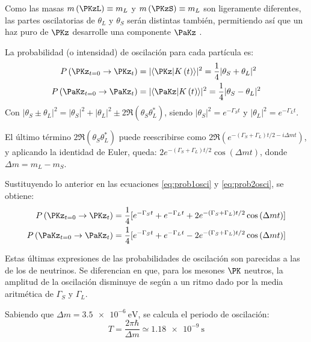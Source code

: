 Como las masas $m\left(\PKzL\right) \equiv m_{L}$ y $m\left(\PKzS\right) \equiv m_{L}$ son ligeramente diferentes, las partes oscilatorias de $\theta_{L}$ y $\theta_{S}$ serán distintas también, permitiendo así que un haz puro de $\PKz$ desarrolle una componente $\PaKz$ \cite{Thomson}.

La probabilidad (o intensidad) de oscilación para cada partícula es:
\begin{align}
P\left(\PKz_{t=0} \rightarrow \PKz_{t}\right)&= |\langle\PKz|K\left(t\right)\rangle|^2 =\dfrac{1}{4}|\theta_{S}+\theta_{L}|^2\label{eq:prob1osci}\\
P\left(\PaKz_{t=0} \rightarrow \PaKz_{t}\right)&= |\langle\PaKz|K\left(t\right)\rangle|^2 =\dfrac{1}{4}|\theta_{S}-\theta_{L}|^2\label{eq:prob2osci}
\end{align}
Con $|\theta_{S} \pm \theta_{L}|^2=|\theta_{S}|^2+|\theta_{L}|^2 \pm 2\Re\left(\theta_{S}\theta_{L}^{\ast}\right)$, siendo $|\theta_{S}|^2=e^{-\Gamma_{S} t}$ y $|\theta_{L}|^2=e^{-\Gamma_{L} t}$. 

El último término $2\Re\left(\theta_{S}\theta_{L}^{\ast}\right)$ puede reescribirse como $2\Re\left(e^{-\left(\Gamma_{S}+\Gamma_{L}\right)t/2-i\Delta mt}\right)$, y aplicando la identidad de Euler, queda: $2e^{-\left(\Gamma_{S}+\Gamma_{L}\right)t/2} \cos \left(\Delta mt\right)$, donde $\Delta m = m_{L}-m_{S}$.

Sustituyendo lo anterior en las ecuaciones \ref{eq:prob1osci} y \ref{eq:prob2osci}, se obtiene:
\begin{align}
P\left(\PKz_{t=0} \rightarrow \PKz_{t}\right) &= \dfrac{1}{4}[e^{-\Gamma_{S}t}+e^{-\Gamma_{L}t}+ 2e^{-\left(\Gamma_{S}+\Gamma_{L}\right)t/2} \cos \left(\Delta mt\right)]\label{eq:int1} \\
P\left(\PaKz_{t=0} \rightarrow \PaKz_{t}\right) &= \dfrac{1}{4}[e^{-\Gamma_{S}t}+e^{-\Gamma_{L}t}-2e^{-\left(\Gamma_{S}+\Gamma_{L}\right)t/2} \cos \left(\Delta mt\right)]\label{eq:int2}
\end{align}

Estas últimas expresiones de las probabilidades de oscilación son parecidas a las de los de neutrinos. Se diferencian en que, para los mesones $\PK$ neutros, la amplitud de la oscilación disminuye de según a un ritmo dado por la media aritmética de $\Gamma_{S}$ y $\Gamma_{L}$.

Sabiendo que $\Delta m = \SI{3,5e-6}{\eV}$, se calcula el periodo de oscilación:
\begin{equation}
T=\dfrac{2\pi\hbar}{\Delta m} \simeq \SI{1.18e-9}{\second}
\end{equation}

